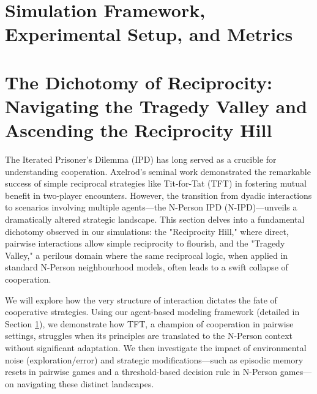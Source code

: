 \documentclass[]{llncs} %
\begin{document}
\section{Simulation Framework, Experimental Setup, and Metrics}
\label{sec:framework_and_methodology} %


\section{The Dichotomy of Reciprocity: Navigating the Tragedy Valley and Ascending the Reciprocity Hill}
\label{sec:results_discussion_valley_hill} %

The Iterated Prisoner's Dilemma (IPD) has long served as a crucible for understanding cooperation. Axelrod's seminal work demonstrated the remarkable success of simple reciprocal strategies like Tit-for-Tat (TFT) in fostering mutual benefit in two-player encounters. However, the transition from dyadic interactions to scenarios involving multiple agents—the N-Person IPD (N-IPD)—unveils a dramatically altered strategic landscape. This section delves into a fundamental dichotomy observed in our simulations: the "Reciprocity Hill," where direct, pairwise interactions allow simple reciprocity to flourish, and the "Tragedy Valley," a perilous domain where the same reciprocal logic, when applied in standard N-Person neighbourhood models, often leads to a swift collapse of cooperation.

We will explore how the very structure of interaction dictates the fate of cooperative strategies. Using our agent-based modeling framework (detailed in Section \ref{sec:framework_and_methodology}), we demonstrate how TFT, a champion of cooperation in pairwise settings, struggles when its principles are translated to the N-Person context without significant adaptation. We then investigate the impact of environmental noise (exploration/error) and strategic modifications—such as episodic memory resets in pairwise games and a threshold-based decision rule in N-Person games—on navigating these distinct landscapes.
\end{document}
